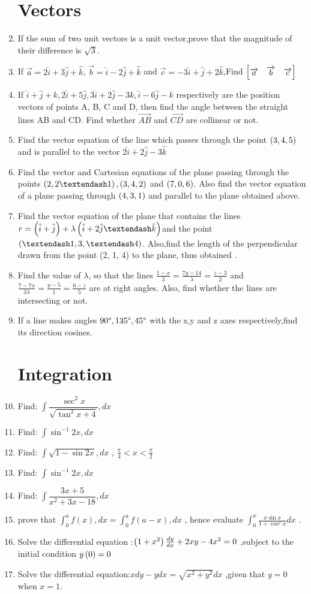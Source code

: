 \documentclass{article}
\begin{document}
\begin{enumerate}
\section{Vectors} 
\item If the sum of two unit vectors is a unit vector,prove that the magnitude of their difference is $\sqrt{3}$.
\item If $\overrightarrow{a}=2\hat{i}+3\hat{j}+\hat{k}$, $\overrightarrow{b}=\hat{i}-2\hat{j}+\hat{k}$ and $\overrightarrow{c}=-3\hat{i}+\hat{j}+2\hat{k}$,Find $\begin{bmatrix}\overrightarrow{a}&\overrightarrow{b}&\overrightarrow{c} \end{bmatrix}$
\item If $\hat{i}+\hat{j}+{k} ,  2\hat{i}+5\hat{j} ,  3\hat{i}+2\hat{j}-3{k} ,  \hat{i}-6\hat{j}-{k}$ respectively are the position vectors of points A, B, C and D, then find the angle between the straight lines AB and CD. Find whether $\overrightarrow{AB}$ and $\overrightarrow{CD}$ are collinear or not. 
\item Find the vector equation of the line which passes through the point $\left(3,4,5\right)$ and is parallel to the vector $2\hat{i}+2\hat{j}-3\hat{k}$
\item Find the vector and Cartesian equations of the plane passing through the points $\brak{2, 2 –1}, \brak{3, 4, 2}$ and $\left(7, 0, 6\right)$. Also find the vector equation of a plane passing through $\left(4, 3, 1\right)$ and parallel to the plane obtained above.
\item Find the vector equation of the plane that contains the lines $r = \brak{\hat{i}+\hat{j}}+\lambda \brak{\hat{i}+ 2\hat{j} –\hat{k}} $and the point $\brak{–1, 3, – 4}$. Also,find the length of the perpendicular drawn from the point (2, 1, 4) to the plane, thus obtained .
\item Find the value of $\lambda$, so that the lines $\frac{1-x}{3}=\frac{7y-14}{\lambda}=\frac{z-3}{2}$ and $\frac{7-7x}{3\lambda}=\frac{y-5}{1}=\frac{6-z}{5}$ are at right angles. Also, find whether the lines are intersecting or not.       
\item If a line makes angles $ 90\degree,135\degree,45\degree$ with the x,y and z axes respectively,find its direction cosines.
\section{Integration}
\item  Find: $\int \dfrac{\sec^2x}{\sqrt{\tan^2x+4}},dx$
\item Find: $\int\sin^{-1}2x,dx $
\item \noindent Find: $\int\sqrt{1-\sin2x},dx$ , $\frac{\pi}{4}< x < \frac{\pi}{2}$
\item Find: $ \int\sin^{-1}2x,dx$
\item Find: $\int\dfrac{3x+5}{x^2+3x-18},dx$
\item prove that $\int_{0}^{a}f(x),dx=\int_{0}^{a}f(a-x),dx$ , hence evaluate $\int_{0}^{\pi}\frac{x\sin x}{1+\cos^2x}dx$ .
\item Solve the differential equation :$\left(1+x^2\right)\frac{dy}{dx}+2xy-4x^2=0$ ,subject to the initial condition $y\left(0\right)=0$ 
\item Solve the differential equation:$xdy-ydx=\sqrt{x^2+y^2}dx$ ,given that $y=0$ when $x=1$.

\end{enumerate}
\end{document}
